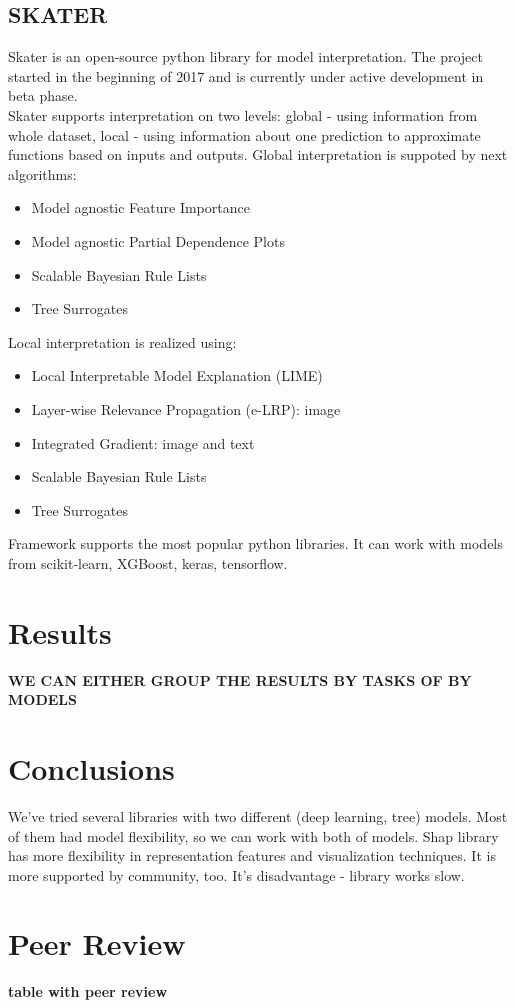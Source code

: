 \subsection{SKATER}
Skater is an open-source python library for model interpretation. The project started in the beginning of 2017 and is currently under active development in beta phase. \\
Skater supports interpretation on two levels: global - using information from whole dataset, local - using information about one prediction to approximate functions based on inputs and outputs. Global interpretation is suppoted by next algorithms:
\begin{itemize}
    \item Model agnostic Feature Importance
    \item Model agnostic Partial Dependence Plots
    \item Scalable Bayesian Rule Lists
    \item Tree Surrogates
\end{itemize}
Local interpretation is realized using:
\begin{itemize}
    \item Local Interpretable Model Explanation (LIME)
    \item Layer-wise Relevance Propagation (e-LRP): image
    \item Integrated Gradient: image and text
    \item Scalable Bayesian Rule Lists
    \item Tree Surrogates
\end{itemize}
Framework supports the most popular python libraries. It can work with models from scikit-learn, XGBoost, keras, tensorflow.

\section{Results}
\textbf{WE CAN EITHER GROUP THE RESULTS BY TASKS OF BY MODELS}

\section{Conclusions}
We've tried several libraries with two different (deep learning, tree) models. Most of them had model flexibility, so we can work with both of  models. 
Shap library has more flexibility in representation features and visualization techniques. It is more supported by community, too. It's disadvantage - library works slow. 

\section{Peer Review}
\textbf{table with peer review}

\newpage
\printbibliography

